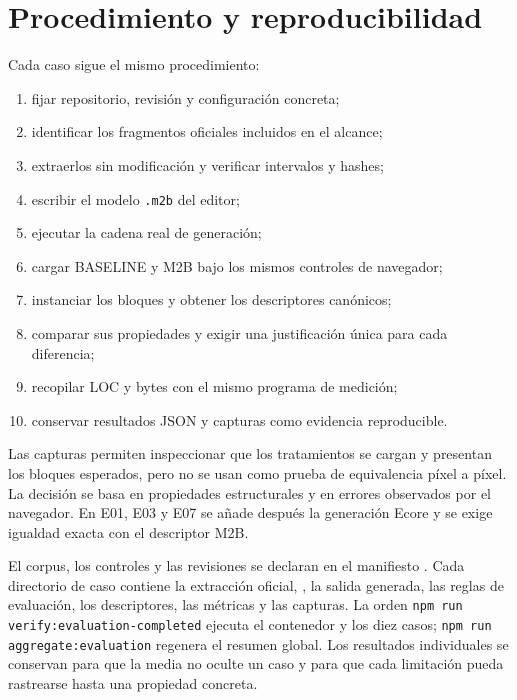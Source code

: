 \section{Procedimiento y reproducibilidad}
\label{sec:procedimiento-evaluacion-blockly}

Cada caso sigue el mismo procedimiento:

\begin{enumerate}
  \item fijar repositorio, revisión y configuración concreta;
  \item identificar los fragmentos oficiales incluidos en el alcance;
  \item extraerlos sin modificación y verificar intervalos y hashes;
  \item escribir el modelo \texttt{.m2b} del editor;
  \item ejecutar la cadena real de generación;
  \item cargar BASELINE y M2B bajo los mismos controles de navegador;
  \item instanciar los bloques y obtener los descriptores canónicos;
  \item comparar sus propiedades y exigir una justificación única para cada
  diferencia;
  \item recopilar LOC y bytes con el mismo programa de medición;
  \item conservar resultados JSON y capturas como evidencia reproducible.
\end{enumerate}

Las capturas permiten inspeccionar que los tratamientos se cargan y presentan
los bloques esperados, pero no se usan como prueba de equivalencia píxel a
píxel. La decisión se basa en propiedades estructurales y en errores observados
por el navegador. En E01, E03 y E07 se añade después la generación Ecore y se
exige igualdad exacta con el descriptor M2B.

El corpus, los controles y las revisiones se declaran en el manifiesto
\allowbreak{}. Cada directorio de caso
contiene la extracción oficial, , la salida generada, las
reglas de evaluación, los descriptores, las métricas y las capturas. La orden
\texttt{npm run verify:evaluation-completed} ejecuta el contenedor y los diez
casos; \texttt{npm run aggregate:evaluation} regenera el resumen global. Los
resultados individuales se conservan para que la media no oculte un caso y para
que cada limitación pueda rastrearse hasta una propiedad concreta.

